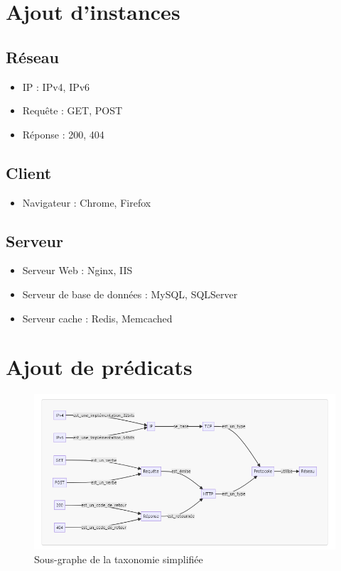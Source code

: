 \documentclass[a4paper,12pt,titlepage]{article}
\begin{document}
\section{Ajout d'instances}

\subsection{Réseau}
\begin{itemize}
    \item IP : IPv4, IPv6
    \item Requête : GET, POST
    \item Réponse : 200, 404
\end{itemize}

\subsection{Client}
\begin{itemize}
    \item Navigateur : Chrome, Firefox
\end{itemize}

\subsection{Serveur}
\begin{itemize}
    \item Serveur Web : Nginx, IIS
    \item Serveur de base de données : MySQL, SQLServer
    \item Serveur cache : Redis, Memcached
\end{itemize}

\section{Ajout de prédicats}
\begin{figure}[H]
    \centering
    \includegraphics[width=\textwidth, height=\textheight, keepaspectratio]{../images/mermaid_v2_sub.png}
    \caption{Sous-graphe de la taxonomie simplifiée}\label{fig:Sous-graphe référençant les prédicats}
\end{figure}
\end{document}

